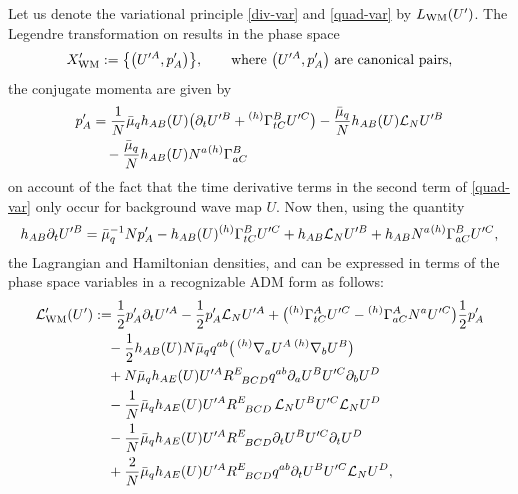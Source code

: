 \documentclass[pdftex]{sigma}
\def\q{\quad}%
\def\ptl{\partial}%
\def\mbo#1{\boldsymbol{#1}}%
\def\grad{{\nabla}}%
\newcommand{\leftexp}[2]{{\vphantom{#2}}^{#1}{#2}}
\def\halb{\frac{1}{2}}%
\numberwithin{equation}{section}
\begin{document}
Let us denote the variational principle \eqref{div-var} and \eqref{quad-var} by $L_{{\rm WM}}(U')$. The Legendre transformation on  results in the phase space
\begin{align*}
X'_{{\rm WM}} := \bigl\{ \bigl(U'^{A}, p'_A\bigr) \bigr\}, \qquad \text{where $\bigl(U'^A, p'_A\bigr)$ are canonical pairs,}
\end{align*}
the conjugate momenta \smash{$p'_A = D_{\mbo{\gamma}} \cdot (p_{A} (s)) \vert_{s=0}$} are given by
\begin{align}
p'_A&{}= \frac{1}{N} \bar{\mu}_q h_{AB}(U) \bigl(\ptl_t U'^B + \leftexp{(h)}{\Gamma}^B_{t C} U'^C\bigr) - \frac{\bar{\mu}_q}{N} h_{AB}(U) \mathcal{L}_N U'^B \notag\\
&\quad{}- \frac{\bar{\mu}_q}{N} h_{AB}(U) N^a \leftexp{(h)}{\Gamma}^B_{a C}\label{u-prime-dot-2}
\end{align}
on account of the fact that the time derivative terms in the second term of \eqref{quad-var} only occur for background wave map $U$. Now then, using the quantity
\begin{align*}
h_{AB} \ptl_t U'^B = \bar{\mu}^{-1}_q N p'_A - h_{AB}(U)\leftexp{(h)}{\Gamma}^B_{tC} U'^C + h_{AB} \mathcal{L}_N U'^B + h_{AB} N^a \leftexp{(h)}{\Gamma}^B_{a C} U'^C,
\end{align*}
the Lagrangian and Hamiltonian densities,  and  can be expressed in terms of the phase space variables  in a recognizable ADM form as follows:
\begin{align*}
\mathcal{L}'_{{\rm WM}} (U') &:=
\halb p'_A \ptl_t U'^A - \halb p'_A \mathcal{L}_N U'^A + \bigl(\leftexp{(h)}{\Gamma}^A_{tC} U'^C - \leftexp{(h)}{\Gamma}^A_{a C} N^a U'^C \bigr)\halb p'_A \notag\\
&\quad{}-\halb h_{AB}(U) N \bar{\mu}_q q^{ab} \bigl(\,\leftexp{(h)}{\grad}_a U^A \, \leftexp{(h)}{\grad}_b U^B \bigr) \notag\\
&\quad{}+ N \bar{\mu}_q h_{AE}(U) U'^A R^E_{\,\,\,\,BCD} q^{a b} \ptl_a U^B U'^C \ptl_b U^D \notag\\
&\quad{} -\frac{1}{N} \bar{\mu}_q h_{AE}(U) U'^A R^E_{\,\,\,\,BCD} \, \mathcal{L}_N U^B U'^C \mathcal{L}_N U^D \notag\\
&\quad{}- \frac{1}{N} \bar{\mu}_q h_{AE}(U) U'^A R^E_{\,\,\,\,BCD} \ptl_t U^B U'^C \ptl_t U^D \notag\\
&\q{} + \frac{2}{N}\bar{\mu}_q h_{AE}(U) U'^A R^E_{\,\,\,\,BCD} q^{a b} \ptl_t U^B U'^C \mathcal{L}_N U^D,
\end{align*}
\end{document}
